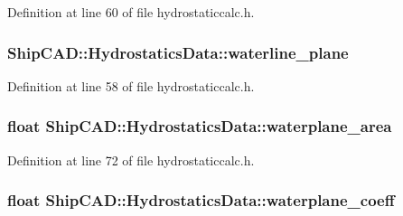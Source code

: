 Definition at line 60 of file hydrostaticcalc.\+h.

\subsubsection[{\texorpdfstring{waterline\+\_\+plane}{waterline_plane}}]{ Ship\+C\+A\+D\+::\+Hydrostatics\+Data\+::waterline\+\_\+plane}\hypertarget{structShipCAD_1_1HydrostaticsData_af93141f846f6622bb146cda042962303}{}\label{structShipCAD_1_1HydrostaticsData_af93141f846f6622bb146cda042962303}


Definition at line 58 of file hydrostaticcalc.\+h.

\subsubsection[{\texorpdfstring{waterplane\+\_\+area}{waterplane_area}}]{\setlength{\rightskip}{0pt plus 5cm}float Ship\+C\+A\+D\+::\+Hydrostatics\+Data\+::waterplane\+\_\+area}\hypertarget{structShipCAD_1_1HydrostaticsData_a5f3432f4d790bbb9c4d75502cb15b7f0}{}\label{structShipCAD_1_1HydrostaticsData_a5f3432f4d790bbb9c4d75502cb15b7f0}


Definition at line 72 of file hydrostaticcalc.\+h.

\subsubsection[{\texorpdfstring{waterplane\+\_\+coeff}{waterplane_coeff}}]{\setlength{\rightskip}{0pt plus 5cm}float Ship\+C\+A\+D\+::\+Hydrostatics\+Data\+::waterplane\+\_\+coeff}\hypertarget{structShipCAD_1_1HydrostaticsData_a4d5eb630367999a611b95dd0d2c2242c}{}\label{structShipCAD_1_1HydrostaticsData_a4d5eb630367999a611b95dd0d2c2242c}


